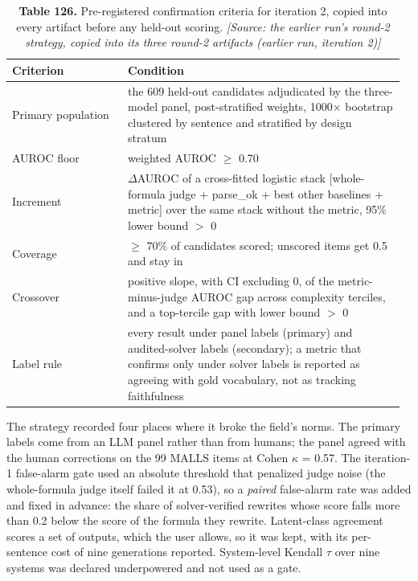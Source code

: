 \documentclass[11pt,letterpaper]{article}
\begin{document}
\begin{table}[H]
\centering
\small
\setlength{\tabcolsep}{3pt}
\caption*{\textbf{Table 126.} Pre-registered confirmation criteria for iteration 2, copied into every artifact before any held-out scoring. \textit{[Source: the earlier run's round-2 strategy, copied into its three round-2 artifacts (earlier run, iteration 2)]}}
\begin{tabular}{>{\raggedright\arraybackslash}p{0.287\linewidth}>{\raggedright\arraybackslash}p{0.678\linewidth}}
\toprule
\textbf{Criterion} & \textbf{Condition} \\
\midrule
{}Primary population & the 609 held-out candidates adjudicated by the three-model panel, post-stratified weights, 1000$\times$ bootstrap clustered by sentence and stratified by design stratum \\
{}AUROC floor & weighted AUROC $\geq$ 0.70 \\
{}Increment & $\Delta$AUROC of a cross-fitted logistic stack [whole-formula judge + parse\_\allowbreak{}ok + best other baselines + metric] over the same stack without the metric, 95\% lower bound $>$ 0 \\
{}Coverage & $\geq$ 70\% of candidates scored; unscored items get 0.5 and stay in \\
{}Crossover & positive slope, with CI excluding 0, of the metric-minus-judge AUROC gap across complexity terciles, and a top-tercile gap with lower bound $>$ 0 \\
{}Label rule & every result under panel labels (primary) and audited-solver labels (secondary); a metric that confirms only under solver labels is reported as agreeing with gold vocabulary, not as tracking faithfulness \\
\bottomrule
\end{tabular}
\end{table}

The strategy recorded four places where it broke the field's norms. The primary labels come from an LLM panel rather than from humans; the panel agreed with the human corrections on the 99 MALLS items at Cohen $\kappa$ = 0.57. The iteration-1 false-alarm gate used an absolute threshold that penalized judge noise (the whole-formula judge itself failed it at 0.53), so a \emph{paired} false-alarm rate was added and fixed in advance: the share of solver-verified rewrites whose score falls more than 0.2 below the score of the formula they rewrite. Latent-class agreement scores a set of outputs, which the user allows, so it was kept, with its per-sentence cost of nine generations reported. System-level Kendall $\tau$ over nine systems was declared underpowered and not used as a gate.
\end{document}
